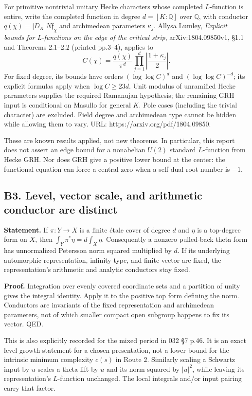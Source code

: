 \documentclass[11pt,a4paper]{article}
\theoremstyle{definition}
\begin{document}
For primitive nontrivial unitary Hecke characters whose completed \(L\)-function is entire, write the completed function in degree \(d=[K:\mathbb Q]\) over \(\mathbb Q\), with conductor \(q(\chi)=|D_K|N\mathfrak f_\chi\) and archimedean parameters \(\kappa_j\). Allysa Lumley, \emph{Explicit bounds for L-functions on the edge of the critical strip}, arXiv:1804.09850v1, §1.1 and Theorems 2.1--2.2 (printed pp.3--4), applies to \[
 C(\chi)=\frac{q(\chi)}{\pi^d}\prod_{j=1}^d\left|\frac{1+\kappa_j}{2}\right|.
\] For fixed degree, its bounds have orders \((\log\log C)^{d}\) and \((\log\log C)^{-d}\); its explicit formulas apply when \(\log C\geq23d\). Unit modulus of unramified Hecke parameters supplies the required Ramanujan hypothesis; the remaining GRH input is conditional on Masullo for general \(K\). Pole cases (including the trivial character) are excluded. Field degree and archimedean type cannot be hidden while allowing them to vary. URL: https://arxiv.org/pdf/1804.09850.

These are known results applied, not new theorems. In particular, this report does not assert an edge bound for a nonabelian \(U(2)\) standard \(L\)-function from Hecke GRH. Nor does GRH give a positive lower bound at the center: the functional equation can force a central zero when a self-dual root number is \(-1\).

\subsection{B3. Level, vector scale, and arithmetic conductor are distinct}\label{b3.-level-vector-scale-and-arithmetic-conductor-are-distinct}

\textbf{Statement.} If \(\pi:Y\to X\) is a finite étale cover of degree \(d\) and \(\eta\) is a top-degree form on \(X\), then \(\int_Y\pi^*\eta=d\int_X\eta\). Consequently a nonzero pulled-back theta form has unnormalized Petersson norm squared multiplied by \(d\). If its underlying automorphic representation, infinity type, and finite vector are fixed, the representation's arithmetic and analytic conductors stay fixed.

\textbf{Proof.} Integration over evenly covered coordinate sets and a partition of unity gives the integral identity. Apply it to the positive top form defining the norm. Conductors are invariants of the fixed representation and archimedean parameters, not of which smaller compact open subgroup happens to fix its vector. QED.

This is also explicitly recorded for the mixed period in 032 §7 p.46. It is an exact level-growth statement for a chosen presentation, not a lower bound for the intrinsic minimum complexity \(c(s)\) in Route 2. Similarly scaling a Schwartz input by \(u\) scales a theta lift by \(u\) and its norm squared by \(|u|^2\), while leaving its representation's \(L\)-function unchanged. The local integrals and/or input pairing carry that factor.
\end{document}
